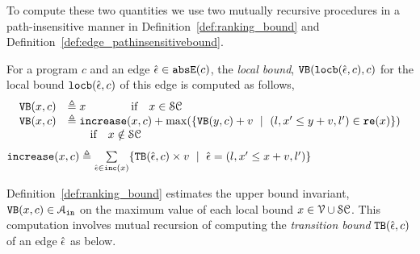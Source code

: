 \begin{enumerate}
To compute these two quantities we use two mutually recursive procedures in a path-insensitive manner
in Definition~\ref{def:ranking_bound} and Definition~\ref{def:edge_pathinsensitivebound}.
\begin{defn}
 \label{def:ranking_bound}
For a program $c$ and an edge $\hat{\mathtt{\epsilon}{}} \in \mathtt{abs}{\mathtt{E}}(c)$,
the \emph{local bound}, ${\mathtt{VB}}(\mathtt{locb}(\hat{\mathtt{\epsilon}{}}, c), c)$ for the local bound $\mathtt{locb}(\hat{\mathtt{\epsilon}{}}, c)$
of this edge
is computed as follows,
 \[ 
\begin{array}{lll}
 {\ensuremath{\mathtt{VB}}}(x, c) & \triangleq x \qquad \qquad \text{if} \quad x \in \mathcal{SC} \\
 {\mathtt{VB}}(x, c) & \triangleq \mathtt{increase}(x, c) + 
 \max(\{{\mathtt{VB}}(y, c) + v ~\mid~ (l, x' \leq y + v, l') \in \mathtt{re}(x)\}) \\
 & \qquad \text{if} \quad x \notin \mathcal{SC}
\end{array}
\]
%
$\mathtt{increase}(x, c) \triangleq \sum\limits_{\hat{\mathtt{\epsilon}{}} \in \mathtt{inc}(x)}\{{\mathtt{TB}}(\hat{\mathtt{\epsilon}{}}, c) \times v ~\mid~ 
\hat{\mathtt{\epsilon}{}} = (l, x' \leq x + v, l')\}$
\end{defn}

Definition~\ref{def:ranking_bound} estimates the upper bound invariant, ${\mathtt{VB}}(x, c) \in \mathcal{A}_{\mathtt{in}}$
on the maximum value of each local bound $x \in \mathcal{V} \cup \mathcal{SC}$.
This computation involves mutual recursion of computing the \emph{transition bound} ${\mathtt{TB}}(\hat{\mathtt{\epsilon}{}}, c)$ of an edge $\hat{\mathtt{\epsilon}{}}$ as below.


\end{enumerate}
